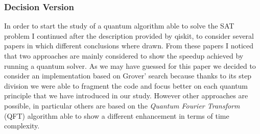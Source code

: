 \documentclass[english]{article}
\begin{document}
			\subsubsection{Decision Version}
			\label{sec:quantumDecisionVersion}
				In order to start the study of a quantum algorithm able to solve the SAT problem I continued after the description provided by qiskit, to consider several papers in which different conclusions where drawn. From these papers I noticed that two approaches are mainly considered to show the speedup achieved by running a quantum solver. As we may have guessed for this paper we decided to consider an implementation based on Grover' search because thanks to its step division we were able to fragment the code and focus better on each quantum principle that we have introduced in our study. However other approaches are possible, in particular others are based on the \emph{Quantum Fourier Transform} (QFT) algorithm able to show a different enhancement in terms of time complexity. \\
				
\end{document}
